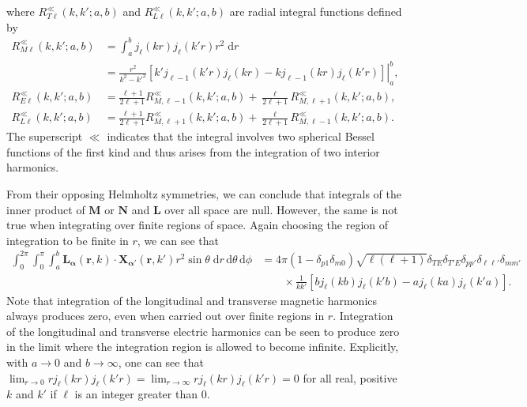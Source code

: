where $R_{T\ell}^\ll(k,k';a,b)$ and $R_{L\ell}^\ll(k,k';a,b)$ are radial integral functions defined by
\begin{equation}\label{eq:finiteRadialIntegrals}
\begin{split}
R_{M\ell}^\ll(k,k';a,b) &= \int_a^bj_\ell(kr)j_\ell(k'r)r^2\;\mathrm{d}r\\
&= \left.\frac{r^2}{k^2 - k'^2}\left[k'j_{\ell - 1}(k'r)j_\ell(kr) - kj_{\ell - 1}(kr)j_\ell(k'r)\right]\right|_a^b,\\[0.5em]
R_{E\ell}^\ll(k,k';a,b) &= \frac{\ell + 1}{2\ell + 1}R_{M,\ell - 1}^\ll(k,k';a,b) + \frac{\ell}{2\ell + 1}R_{M,\ell + 1}^\ll(k,k';a,b),\\
R_{L\ell}^\ll(k,k';a,b) &= \frac{\ell + 1}{2\ell + 1}R_{M,\ell + 1}^\ll(k,k';a,b) + \frac{\ell}{2\ell + 1}R_{M,\ell - 1}^\ll(k,k';a,b).
\end{split}
\end{equation}
The superscript $\ll$ indicates that the integral involves two spherical Bessel functions of the first kind and thus arises from the integration of two interior harmonics. 

From their opposing Helmholtz symmetries, we can conclude that integrals of the inner product of $\mathbf{M}$ or $\mathbf{N}$ and $\mathbf{L}$ over all space are null. However, the same is not true when integrating over finite regions of space. Again choosing the region of integration to be finite in $r$, we can see that
\begin{equation}\label{eq:vectorSphericalHarmonicOrthogonalityConditionFiniteMixed}
\begin{split}
\int_0^{2\pi}\int_0^{\pi}\int_a^b\mathbf{L}_{\bm{\alpha}}(\mathbf{r},k)\cdot\mathbf{X}_{\bm{\alpha}'}(\mathbf{r},k')r^2\sin\theta\;\mathrm{d}r\,\mathrm{d}\theta\,\mathrm{d}\phi &= 4\pi(1 - \delta_{p1}\delta_{m0})\sqrt{\ell(\ell + 1)}\delta_{TE}\delta_{T'E}\delta_{pp'}\delta_{\ell\ell'}\delta_{mm'}\\[-0.5em]
&\qquad\times\frac{1}{kk'}\left[bj_\ell(kb)j_\ell(k'b) - aj_\ell(ka)j_\ell(k'a)\right].
\end{split}
\end{equation}
Note that integration of the longitudinal and transverse magnetic harmonics always produces zero, even when carried out over finite regions in $r$. Integration of the longitudinal and transverse electric harmonics can be seen to produce zero in the limit where the integration region is allowed to become infinite. Explicitly, with $a\to0$ and $b\to\infty$, one can see that $\lim_{r\to0}rj_\ell(kr)j_\ell(k'r) = \lim_{r\to\infty}rj_\ell(kr)j_\ell(k'r) = 0$ for all real, positive $k$ and $k'$ if $\ell$ is an integer greater than 0.

